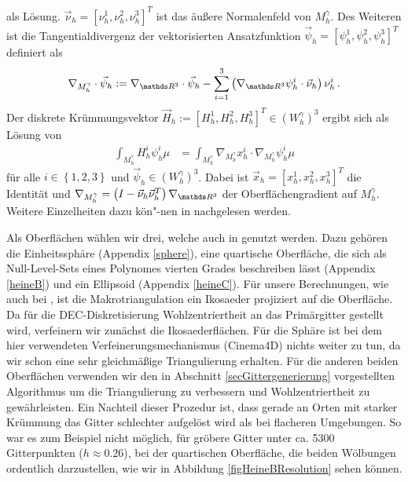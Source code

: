   als Lösung.
  \( \vec{\nu}_{h}=\left[ \nu_{h}^{1}, \nu_{h}^{2}, \nu_{h}^{3} \right]^{T} \) ist das äußere Normalenfeld von \( M_{h}^{\gamma} \).
  Des Weiteren ist die Tangentialdivergenz der vektorisierten Ansatzfunktion \( \vec{\psi}_{h} = \left[ \psi_{h}^{1}, \psi_{h}^{2}, \psi_{h}^{3} \right]^{T} \) definiert als
  \begin{align}
    \nabla_{M_{h}^{\gamma}} \cdot \vec{\psi}_{h} := \nabla_{\R^{3}} \cdot \vec{\psi}_{h} 
                          - \sum_{i=1}^{3 }\left( \nabla_{\R^{3}}\psi_{h}^{i} \cdot \vec{\nu}_{h} \right) \nu_{h}^{i} \formpunkt
  \end{align}
  Der diskrete Krümmungsvektor \( \vec{H}_{h} := \left[ H_{h}^{1}, H_{h}^{2}, H_{h}^{3} \right]^{T} \in\left( W_{h}^{\gamma} \right)^{3} \) ergibt sich als Lösung von
  \begin{align}
    \int_{M_{h}^{\gamma}} H_{h}^{i} \psi_{h}^{i} \mu
      &=  \int_{M_{h}^{\gamma}} \nabla_{M_{h}^{\gamma}} x_{h}^{i} \cdot \nabla_{M_{h}^{\gamma}}\psi_{h}^{i} \mu
  \end{align}
  für alle \( i\in\left\{ 1,2,3 \right\} \) und \( \vec{\psi}_{h}\in \left( W_{h}^{\gamma} \right)^{3} \).
  Dabei ist \( \vec{x}_{h} = \left[ x_{h}^{1}, x_{h}^{2}, x_{h}^{3}\right]^{T} \) die Identität 
  und \mbox{\(\nabla_{M_{h}^{\gamma}} = \left( I - \vec{\nu}_{h} \vec{\nu}^{T}_{h} \right)\nabla_{\R^{3}} \)} der Oberflächengradient auf \( M_{h}^{\gamma} \). 
  Weitere Einzelheiten dazu kön"-nen in \cite{heine} nachgelesen werden.
  
  Als Oberflächen wählen wir drei, welche auch in \cite{heine} genutzt werden. 
  Dazu gehören die Einheitssphäre (Appendix \ref{sphere}), eine quartische Oberfläche, die sich als Null-Level-Sets eines Polynomes vierten
  Grades beschreiben lässt (Appendix \ref{heineB}) und ein Ellipsoid (Appendix \ref{heineC}).
  Für unsere Berechnungen, wie auch bei \cite{heine}, ist die Makrotriangulation ein Ikosaeder projiziert auf die Oberfläche.
  Da für die DEC-Diskretisierung Wohlzentriertheit an das Primärgitter gestellt wird, verfeinern wir zunächst die Ikosaederflächen.
  Für die Sphäre ist bei dem hier verwendeten Verfeinerungsmechanismus \mbox{(Cinema4D)} nichts weiter zu tun, da wir schon eine sehr gleichmäßige
  Triangulierung erhalten.
  Für die anderen beiden Oberflächen verwenden wir den in Abschnitt \ref{secGittergenerierung} vorgestellten Algorithmus um die
  Triangulierung zu verbessern und Wohlzentriertheit zu gewährleisten.
  Ein Nachteil dieser Prozedur ist, dass gerade an Orten mit starker Krümmung das Gitter schlechter aufgelöst wird als bei flacheren
  Umgebungen. 
  So war es zum Beispiel nicht möglich, für gröbere Gitter unter ca. 5300 Gitterpunkten (\( h\approx 0.26 \)), bei der quartischen
  Oberfläche, die beiden Wölbungen ordentlich darzustellen, wie wir in Abbildung \ref{figHeineBResolution} sehen können.
  
